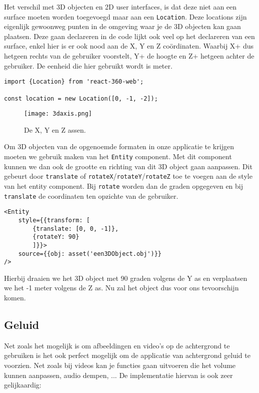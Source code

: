 Het verschil met 3D objecten en 2D user interfaces, is dat deze niet aan een surface moeten worden toegevoegd maar aan een \lstinline[basicstyle=\ttfamily\color{red}]|Location|. Deze locations zijn eigenlijk gewoonweg punten in de omgeving waar je de 3D objecten kan gaan plaatsen. Deze gaan declareren in de code lijkt ook veel op het declareren van een surface, enkel hier is er ook nood aan de X, Y en Z coördinaten. Waarbij X+ dus hetgeen rechts van de gebruiker voorstelt, Y+ de hoogte en Z+ hetgeen achter de gebruiker. De eenheid die hier gebruikt wordt is meter.

\begin{lstlisting}[frame=single, caption=Voorbeeld van een surface]
import {Location} from 'react-360-web';

const location = new Location([0, -1, -2]);
\end{lstlisting}

\begin{figure}[H]
	\centering
	\texttt{[image: 3daxis.png]}
	\caption{De X, Y en Z assen.}
	\label{fig:xyz-axis}
\end{figure}

Om 3D objecten van de opgenoemde formaten in onze applicatie te krijgen moeten we gebruik maken van het \lstinline[basicstyle=\ttfamily\color{red}]|Entity| component. Met dit component kunnen we dan ook de grootte en richting van dit 3D object gaan aanpassen. Dit gebeurt door \lstinline[basicstyle=\ttfamily\color{red}]|translate| of \lstinline[basicstyle=\ttfamily\color{red}]|rotateX|/\lstinline[basicstyle=\ttfamily\color{red}]|rotateY|/\lstinline[basicstyle=\ttfamily\color{red}]|rotateZ| toe te voegen aan de style van het entity component. Bij \lstinline[basicstyle=\ttfamily\color{red}]|rotate| worden dan de graden opgegeven en bij \lstinline[basicstyle=\ttfamily\color{red}]|translate| de coordinaten ten opzichte van de gebruiker.

\begin{lstlisting}[frame=single, caption=Voorbeeld van een Entity component]
<Entity 
	style={{transform: [
		{translate: [0, 0, -1]},
		{rotateY: 90}
		]}}>
	source={{obj: asset('een3DObject.obj')}}
/>
\end{lstlisting}

Hierbij draaien we het 3D object met 90 graden volgens de Y as en verplaatsen we het -1 meter volgens de Z as. Nu zal het object dus voor ons tevoorschijn komen.

\subsection{Geluid}
\label{subsec:Geluid}
Net zoals het mogelijk is om afbeeldingen en video's op de achtergrond te gebruiken is het ook perfect mogelijk om de applicatie van achtergrond geluid te voorzien. Net zoals bij videos kan je functies gaan uitvoeren die het volume kunnen aanpassen, audio dempen, ... De implementatie hiervan is ook zeer gelijkaardig:

